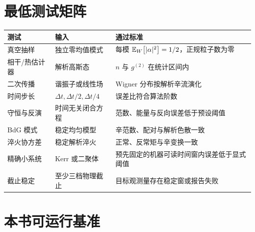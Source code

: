 \section{最低测试矩阵}

\begin{center}
\begin{tabularx}{\textwidth}{p{}XX}
\toprule
测试 & 输入 & 通过标准 \\
\midrule
真空抽样 & 独立零均值模式 & 每模 $\mathbb{E}_{W}\!\left[|\alpha|^2\right]=1/2$，正规粒子数为零 \\
相干/热估计器 & 解析高斯态 & $n$ 与 $g^{(2)}$ 在统计区间内 \\
二次传播 & 谐振子或线性场 & Wigner 分布按解析辛流演化 \\
时间步长 & $\Delta t,\Delta t/2,\Delta t/4$ & 误差比符合算法阶数 \\
守恒与反演 & 时间无关闭合方程 & 范数、能量与反向误差低于预设阈值 \\
BdG 模式 & 稳定均匀模型 & 辛范数、配对与解析色散一致 \\
淬火协方差 & 稳定解析淬火 & 正常、反常矩与辛变换一致 \\
精确小系统 & Kerr 或二聚体 & 预先固定的机器可读时间窗内误差低于显式阈值 \\
截止稳定 & 至少三档物理截止 & 目标观测量存在稳定窗或报告失败 \\
\bottomrule
\end{tabularx}
\end{center}

\section{本书可运行基准}

